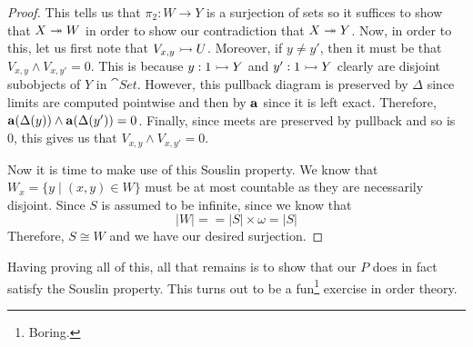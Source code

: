 \begin{proof}
  This tells us that $\pi_2 : W \to Y$ is a surjection of sets so it
  suffices to show that $X \twoheadrightarrow W$ in order to show our contradiction
  that $X \twoheadrightarrow Y$. Now, in order to this, let us first note that
  $V_{x, y} \rightarrowtail U$. Moreover, if $y \neq y'$, then it must be that
  $V_{x, y} \wedge V_{x, y'} = 0$. This is because $y : 1 \rightarrowtail Y$ and
  $y' : 1 \rightarrowtail Y$ clearly are disjoint subobjects of $Y$ in
  $\cat{Set}$. However, this pullback diagram is preserved by $\Delta$
  since limits are computed pointwise and then by $\mathbf{a}$ since it
  is left exact. Therefore,
  $\mathbf{a}(\Delta(y)) \wedge \mathbf{a}(\Delta(y')) = 0$. Finally,
  since meets are preserved by pullback and so is $0$, this gives us
  that $V_{x, y} \wedge V_{x, y'} = 0$.

  Now it is time to make use of this Souslin property. We know that
  $W_x = \{y \mid (x, y) \in W\}$ must be at most countable as they
  are necessarily disjoint. Since $S$ is assumed to be infinite, since
  we know that
  \[
    \left\vert W \right\vert = = \left\vert S \right\vert \times \omega
    = \left\vert S \right\vert
  \]
  Therefore, $S \cong W$ and we have our desired surjection.
\end{proof}

Having proving all of this, all that remains is to show that our $P$
does in fact satisfy the Souslin property. This turns out to be a
fun\footnote{Boring.} exercise in order theory.

